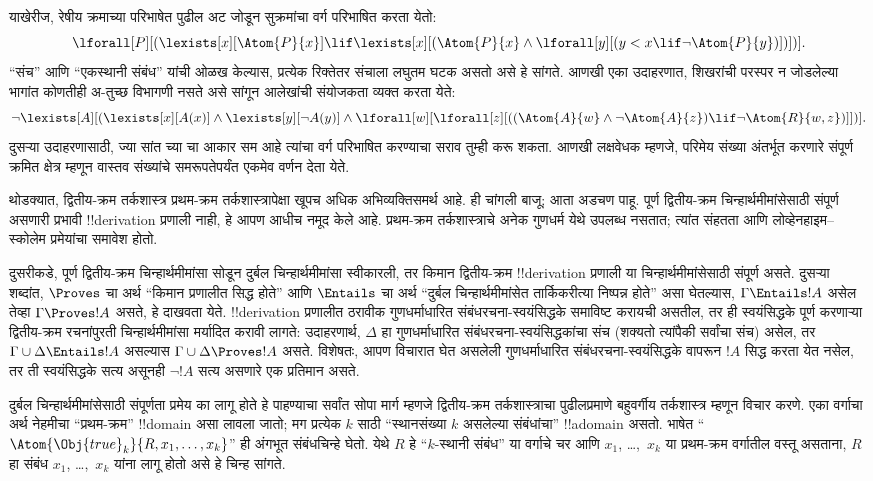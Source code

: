 \documentclass[../../../include/open-logic-section]{subfiles}
\begin{document}
याखेरीज, रेषीय क्रमाच्या परिभाषेत पुढील अट जोडून सुक्रमांचा वर्ग परिभाषित
करता येतो:
\[
\lforall[P][(\lexists[x][\Atom{P}{x}] \lif \lexists[x][(\Atom{P}{x}
    \land \lforall[y][(y < x \lif \lnot \Atom{P}{y})])])].
\]
“संच” आणि “एकस्थानी संबंध” यांची ओळख केल्यास, प्रत्येक रिक्तेतर संचाला
लघुतम घटक असतो असे हे सांगते. आणखी एका उदाहरणात, शिखरांची परस्पर न जोडलेल्या
भागांत कोणतीही अ-तुच्छ विभागणी नसते असे सांगून आलेखांची संयोजकता व्यक्त करता
येते:
\[
\lnot \lexists[A][(\lexists[x][A(x)] \land \lexists[y][\lnot A(y)]
  \land \lforall[w][\lforall[z][((\Atom{A}{w} \land \lnot \Atom{A}{z})
      \lif \lnot \Atom{R}{w,z})]])].
\]
दुसऱ्या उदाहरणासाठी, ज्या सांत च्या चा आकार सम
आहे त्यांचा वर्ग परिभाषित करण्याचा सराव तुम्ही करू शकता. आणखी लक्षवेधक
म्हणजे, परिमेय संख्या अंतर्भूत करणारे संपूर्ण क्रमित क्षेत्र म्हणून वास्तव
संख्यांचे समरूपतेपर्यंत एकमेव वर्णन देता येते.

थोडक्यात, द्वितीय-क्रम तर्कशास्त्र प्रथम-क्रम तर्कशास्त्रापेक्षा खूपच अधिक
अभिव्यक्तिसमर्थ आहे. ही चांगली बाजू; आता अडचण पाहू. पूर्ण द्वितीय-क्रम
चिन्हार्थमीमांसेसाठी संपूर्ण असणारी प्रभावी !!{derivation} प्रणाली नाही, हे
आपण आधीच नमूद केले आहे. प्रथम-क्रम तर्कशास्त्राचे अनेक गुणधर्म येथे उपलब्ध
नसतात; त्यांत संहतता आणि लोव्हेनहाइम--स्कोलेम प्रमेयांचा समावेश होतो.

दुसरीकडे, पूर्ण द्वितीय-क्रम चिन्हार्थमीमांसा सोडून दुर्बल चिन्हार्थमीमांसा
स्वीकारली, तर किमान द्वितीय-क्रम !!{derivation} प्रणाली या
चिन्हार्थमीमांसेसाठी संपूर्ण असते. दुसऱ्या शब्दांत, $\Proves$ चा अर्थ
“किमान प्रणालीत सिद्ध होते” आणि $\Entails$ चा अर्थ “दुर्बल
चिन्हार्थमीमांसेत तार्किकरीत्या निष्पन्न होते” असा घेतल्यास, $\Gamma \Entails
!A$ असेल तेव्हा $\Gamma \Proves !A$ असते, हे दाखवता येते.
!!{derivation} प्रणालीत ठरावीक गुणधर्माधारित संबंधरचना-स्वयंसिद्धके समाविष्ट
करायची असतील, तर ही स्वयंसिद्धके पूर्ण करणाऱ्या द्वितीय-क्रम रचनांपुरती
चिन्हार्थमीमांसा मर्यादित करावी लागते: उदाहरणार्थ, $\Delta$ हा
गुणधर्माधारित संबंधरचना-स्वयंसिद्धकांचा संच (शक्यतो त्यांपैकी सर्वांचा संच)
असेल, तर $\Gamma \cup \Delta \Entails !A$ असल्यास $\Gamma \cup \Delta
\Proves !A$ असते. विशेषतः, आपण विचारात घेत असलेली गुणधर्माधारित
संबंधरचना-स्वयंसिद्धके वापरून $!A$ सिद्ध करता येत नसेल, तर ती स्वयंसिद्धके
सत्य असूनही $\lnot !A$ सत्य असणारे एक प्रतिमान असते.

दुर्बल चिन्हार्थमीमांसेसाठी संपूर्णता प्रमेय का लागू होते हे पाहण्याचा सर्वांत
सोपा मार्ग म्हणजे द्वितीय-क्रम तर्कशास्त्राचा पुढीलप्रमाणे बहुवर्गीय
तर्कशास्त्र म्हणून विचार करणे. एका वर्गाचा अर्थ नेहमीचा “प्रथम-क्रम”
!!{domain} असा लावला जातो; मग प्रत्येक $k$ साठी “स्थानसंख्या $k$ असलेल्या
संबंधांचा” !!a{domain} असतो. भाषेत
“$\Atom{\Obj{true}_k}{R,x_1,\dots,x_k}$” ही अंगभूत संबंधचिन्हे घेतो. येथे
$R$ हे “$k$-स्थानी संबंध” या वर्गाचे चर आणि $x_1$, \dots,~$x_k$ या
प्रथम-क्रम वर्गातील वस्तू असताना, $R$ हा संबंध $x_1$, \dots,~$x_k$ यांना
लागू होतो असे हे चिन्ह सांगते.
\end{document}
